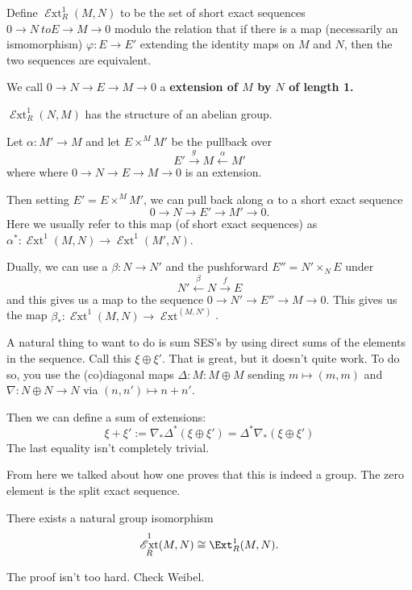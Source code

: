 \documentclass[12pt]{article}
\DeclareMathOperator{\sExt}{\mathscr{E}xt}
\begin{document}
\begin{defn}
	Define $\sExt_R^1(M,N)$ to be the set of short exact sequences $0\to N\ to E\to M\to 0$
	modulo the relation that if there is a map (necessarily an ismomorphism) $\varphi:E\to E'$ extending 
	the identity maps on $M$ and $N$, then the two sequences are equivalent.

	We call $0\to N\to E\to M\to 0$ a \textbf{extension of $M$ by $N$ of length 1.}
\end{defn}
\begin{prop}
	$\sExt_R^1(N,M)$ has the structure of an abelian group.
\end{prop}
\begin{rmk}
	Let $\alpha:M'\to M$ and let $E\times^MM'$ be the pullback over
	\[E'\xrightarrow{g} M\xleftarrow{\alpha}M'\]
	where where $0\to N\to E\to M\to 0$ is an extension.

	Then setting $E'=E\times^MM'$, we can pull back along $\alpha$ to a short exact sequence 
	\[0\to N\to E'\to M'\to 0.\]
	Here we usually refer to this map (of short exact sequences) as $\alpha^*:\sExt^1(M,N)\to \sExt^1(M',N)$.

	Dually, we can use a $\beta:N\to N'$ and the pushforward $E''=N'\times_NE$ under
	\[N'\xleftarrow{\beta} N\xrightarrow{f}E\]
	and this gives us a map to the sequence $0\to N'\to E''\to M\to 0$. This gives us 
	the map $\beta_*:\sExt^1(M,N)\to \sExt^(M,N')$.
\end{rmk}

\begin{rmk}
	A natural thing to want to do is sum SES's by using direct sums of the elements in the sequence.
	Call this $\xi\oplus \xi'$.
	That is great, but it doesn't quite work. To do so, you use the (co)diagonal maps $\Delta:M:M\oplus M$
	sending $m\mapsto(m,m)$ and $\nabla:N\oplus N\to N$ via $(n,n')\mapsto n+n'$.

	Then we can define a sum of extensions:
	\[\xi+\xi':= \nabla_*\Delta^*(\xi\oplus\xi')=\Delta^*\nabla_*(\xi\oplus\xi')\]
	The last equality isn't completely trivial.
\end{rmk}
From here we talked about how one proves that this is indeed a group. The zero element is the split exact sequence.
\begin{prop}
	There exists a natural group isomorphism
	\[\sExt^1_R(M,N)\cong\Ext_R^1(M,N).\]
\end{prop}
\begin{rmk}
	The proof isn't too hard. Check Weibel.
\end{rmk}
\end{document}
